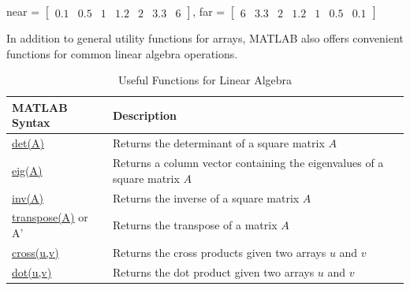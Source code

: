\documentclass[../MATLAB_Primer.tex]{subfiles}
\begin{document}
\begin{center}
    near = $\begin{bmatrix}
     0.1 & 0.5 & 1 & 1.2 & 2 & 3.3 & 6
    \end{bmatrix}$,\quad
    far = $\begin{bmatrix}
     6 & 3.3 & 2 & 1.2 & 1 & 0.5 & 0.1
    \end{bmatrix}$
\end{center}
\begin{center}
     
\end{center}
In addition to general utility functions for arrays, MATLAB also offers convenient functions for common linear algebra operations. 

\begin{table}[H]
    \caption{Useful Functions for Linear Algebra}
    \begin{center}
        \begin{tabular}{| C{3cm} | m{12cm} |}
                \hline
                \textbf{MATLAB Syntax} & \textbf{Description}\\
            
                \hline
                \href{https://www.mathworks.com/help/matlab/ref/det.html}{\color{blue}det(A)} & Returns the determinant of a square matrix $A$\\
                \hline
                
                \href{https://www.mathworks.com/help/matlab/ref/eig.html}{\color{blue}eig(A)} & Returns a column vector containing the eigenvalues of a square matrix $A$\\
                \hline
                
                \href{https://www.mathworks.com/help/matlab/ref/inv.html}{\color{blue}inv(A)} & Returns the inverse of a square matrix $A$\\
                \hline
                
                \href{https://www.mathworks.com/help/matlab/ref/transpose.html}{\color{blue}transpose(A)} or A' & Returns the transpose of a matrix $A$\\
                \hline
                
                \href{https://www.mathworks.com/help/matlab/ref/cross.html}{\color{blue}cross(u,v)} & Returns the cross products given two arrays $u$ and $v$\\
                \hline
                
                \href{https://www.mathworks.com/help/matlab/ref/dot.html}{\color{blue}dot(u,v)} & Returns the dot product given two arrays $u$ and $v$\\
                \hline
        \end{tabular}
    \end{center}
    \label{tab:linalg_functions}
\end{table}
\end{document}
